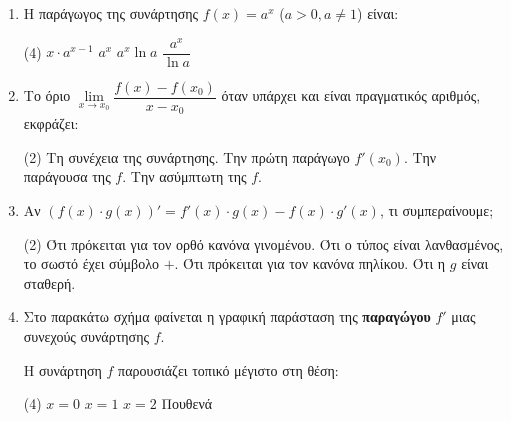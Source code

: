 \begin{enumerate}[label=\textbf{2.\arabic*.}, itemsep=4mm]
    \item Η παράγωγος της συνάρτησης $f(x) = a^x$ ($a > 0, a \neq 1$) είναι:
    \begin{tasks}[label=\let\textdexiakeraia\relax\alph*.](4)
        \task $x \cdot a^{x-1}$
        \task $a^x$
        \task $a^x \ln a$
        \task $\dfrac{a^x}{\ln a}$
    \end{tasks}

    \item Το όριο $\lim\limits_{x \to x_0} \dfrac{f(x) - f(x_0)}{x - x_0}$ όταν υπάρχει και είναι πραγματικός αριθμός, εκφράζει:
    \begin{tasks}[label=\let\textdexiakeraia\relax\alph*.](2)
        \task Τη συνέχεια της συνάρτησης.
        \task Την πρώτη παράγωγο $f'(x_0)$.
        \task Την παράγουσα της $f$.
        \task Την ασύμπτωτη της $f$.
    \end{tasks}

    \item Αν $(f(x) \cdot g(x))' = f'(x) \cdot g(x) - f(x) \cdot g'(x)$, τι συμπεραίνουμε;
    \begin{tasks}[label=\let\textdexiakeraia\relax\alph*.](2)
        \task Ότι πρόκειται για τον ορθό κανόνα γινομένου.
        \task Ότι ο τύπος είναι λανθασμένος, το σωστό έχει σύμβολο $+$.
        \task Ότι πρόκειται για τον κανόνα πηλίκου.
        \task Ότι η $g$ είναι σταθερή.
    \end{tasks}

    \item Στο παρακάτω σχήμα φαίνεται η γραφική παράσταση της \textbf{παραγώγου} $f'$ μιας συνεχούς συνάρτησης $f$.
    \begin{center}
    \end{center}
    Η συνάρτηση $f$ παρουσιάζει τοπικό μέγιστο στη θέση:
    \begin{tasks}[label=\let\textdexiakeraia\relax\alph*.](4)
        \task $x = 0$
        \task $x = 1$
        \task $x = 2$
        \task Πουθενά
    \end{tasks}


\end{enumerate}
